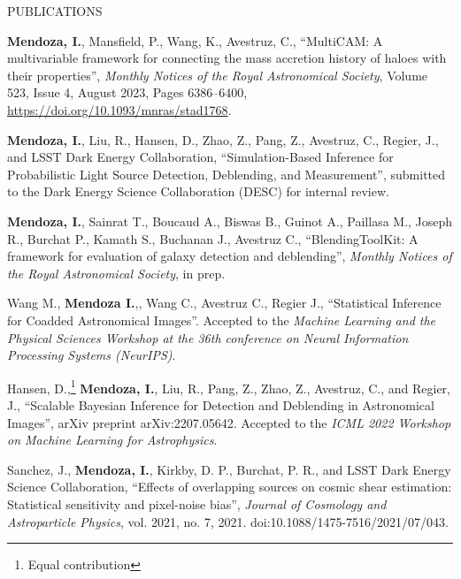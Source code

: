 \documentclass{resume} %
\begin{document}
\begin{rSection}{PUBLICATIONS}
%
\vspace*{-1em}

\item \textbf{Mendoza, I.}, Mansfield, P., Wang, K., Avestruz, C., ``MultiCAM: A multivariable framework for connecting the mass accretion history of haloes with their properties'', \textit{Monthly Notices of the Royal Astronomical Society}, Volume 523, Issue 4, August 2023, Pages 6386–6400, \url{https://doi.org/10.1093/mnras/stad1768}.

\item \textbf{Mendoza, I.}, Liu, R., Hansen, D., Zhao, Z., Pang, Z., Avestruz, C., Regier, J., and LSST Dark Energy Collaboration, ``Simulation-Based Inference for Probabilistic Light Source Detection, Deblending, and Measurement'', submitted to the Dark Energy Science Collaboration (DESC) for internal review.

\item \textbf{Mendoza, I.}, Sainrat T., Boucaud A., Biswas B., Guinot A., Paillasa M., Joseph R., Burchat P., Kamath S., Buchanan J., Avestruz C., ``BlendingToolKit:  A framework for evaluation of galaxy detection and deblending'', \textit{Monthly Notices of the Royal Astronomical Society}, in prep.

\item Wang M., \textbf{Mendoza I.},, Wang C., Avestruz C., Regier J., ``Statistical Inference for Coadded Astronomical Images''. Accepted to the \textit{Machine Learning and the Physical Sciences Workshop at the 36th conference on Neural Information Processing Systems (NeurIPS)}.

\item Hansen, D.,\footnote[1]{\label{ft:equal} Equal contribution} \textbf{Mendoza, I.}, Liu, R., Pang, Z., Zhao, Z., Avestruz, C., and Regier, J., ``Scalable Bayesian Inference for Detection and Deblending in Astronomical Images'', arXiv preprint arXiv:2207.05642. Accepted to the \textit{ICML 2022 Workshop on Machine Learning for Astrophysics}.

\item Sanchez, J., \textbf{Mendoza, I.}, Kirkby, D. P., Burchat, P. R., and LSST Dark Energy Science Collaboration, “Effects of overlapping sources on cosmic shear estimation: Statistical sensitivity and pixel-noise bias”, \textit{Journal of Cosmology and Astroparticle Physics}, vol. 2021, no. 7, 2021. doi:10.1088/1475-7516/2021/07/043.

\end{rSection}
\end{document}

